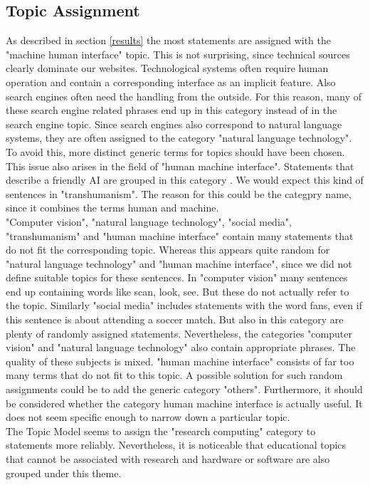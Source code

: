 \subsection{Topic Assignment}
\label{topics}
As described in section \ref{results} the most statements are assigned with the "machine human interface" topic.
This is not surprising, since technical sources clearly dominate our websites.
Technological systems often require human operation and contain a corresponding interface as an implicit feature.
Also search engines often need the handling from the outside.
For this reason, many of these search engine related phrases end up in this category instead of in the search engine topic.
Since search engines also correspond to natural language systems, they are often assigned to the category "natural language technology".
To avoid this, more distinct generic terms for topics should have been chosen.
This issue also arises in the field of "human machine interface".
Statements that describe a friendly AI are grouped in this category .
We would expect this kind of sentences in "transhumanism".
The reason for this could be the categpry name, since it combines the terms human and machine.
\\
"Computer vision", "natural language technology", "social media", "transhumanism" and "human machine interface" contain many statements that do not fit the corresponding topic.
Whereas this appears quite random for "natural language technology" and "human machine interface", since we did not define suitable topics for these sentences.
In "computer vision" many sentences end up containing words like scan, look, see.
But these do not actually refer to the topic.
Similarly "social media" includes  statements with the word fans, even if this sentence is about attending a soccer match.
But also in this category are plenty of randomly assigned statements.
Nevertheless, the categories "computer vision" and "natural language technology" also contain appropriate phrases.
The quality of these subjects is mixed.
"human machine interface" consists of far too many terms that do not fit to this topic.
A possible solution for such random assignments could be to add the generic category "others".
Furthermore, it should be considered whether the category human machine interface is actually useful.
It does not seem specific enough to narrow down a particular topic.
\\
The Topic Model seems to assign the "research computing" category to statements more reliably.
Nevertheless, it is noticeable that educational topics that cannot be associated with research and hardware or software are also grouped under this theme.
